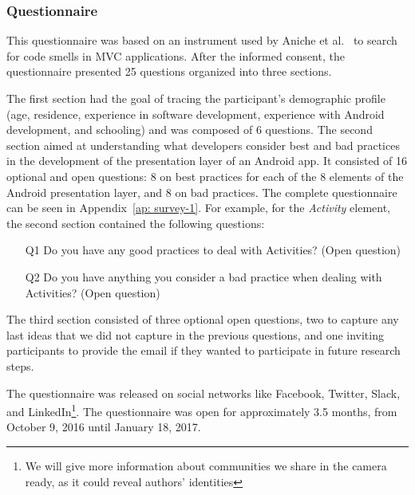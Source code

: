 \subsubsection{Questionnaire}
\label{etapa-1-questionario}

This questionnaire was based on an instrument used by Aniche et al.~\cite{AnicheSmellsMVC:17, FinavaroAniche2016} to search for code smells in \acs{MVC} applications. 
After the informed consent, the questionnaire presented 25  questions organized into three sections.

The first section had the goal of tracing the participant's demographic profile (age, residence, experience in software development, experience with Android development, and schooling) and was composed of 6 questions. The second section aimed at understanding what developers consider best and bad practices in the development of the presentation layer of an Android app. It consisted of 16 optional and open questions: 8 on best practices for each of the 8 elements of the Android presentation layer, and 8 on bad practices. The complete questionnaire can be seen in Appendix~\ref{ap: survey-1}. 
For example, for the \textit{Activity} element, the second section contained the following questions:

\begin{itemize}
  \item[Q1] Do you have any good practices to deal with Activities? (Open question)
  \item[Q2] Do you have anything you consider a bad practice when dealing with Activities? (Open question)
\end{itemize}


The third section consisted of three optional open questions, 
two to capture any last ideas that we did not capture in the previous questions, and one inviting participants to provide the email if they wanted to participate in future research steps.


The questionnaire was released on social networks like Facebook, Twitter, Slack, and LinkedIn\footnote{We will give more information about communities we share in the camera ready, as it could reveal authors' identities}. The questionnaire was open for approximately 3.5 months, from October 9, 2016 until January 18, 2017.


